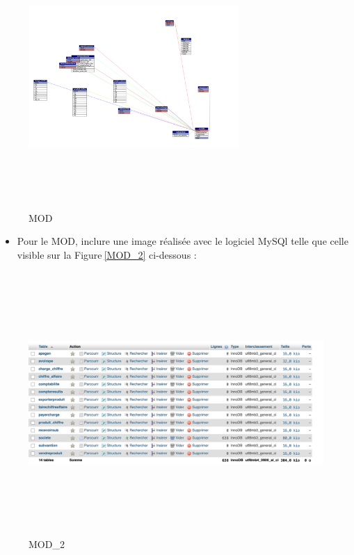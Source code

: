 \documentclass[mstat,12pt]{unswthesis}
\begin{document}
\begin{figure}
\centering
\includegraphics[width=8cm,height=10cm]{MOD.png}
\caption{MOD}\label{MOD}
\end{figure}

\begin{itemize}
\tightlist
\item
  Pour le MOD, inclure une image réalisée avec le logiciel MySQl
  \newline telle que celle visible sur la Figure\(~\)\ref{MOD_2}
  ci-dessous :
\end{itemize}

\begin{figure}
\centering
\includegraphics[width=15cm,height=10cm]{MOD_2.png}
\caption{MOD\_2}\label{MOD}
\end{figure}
\end{document}
